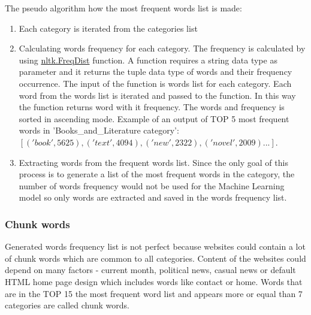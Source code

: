 The pseudo algorithm how the most frequent words list is made:
\begin{enumerate}
    \item Each category is iterated from the categories list
    \item Calculating words frequency for each category. The frequency is calculated by using \href{http://www.nltk.org/api/nltk.html?highlight=freqdist}{nltk.FreqDist} function. A function requires a string data type as parameter and it returns the tuple data type of words and their frequency occurrence. The input of the function is words list for each category. Each word from the words list is iterated and passed to the function. In this way the function returns word with it frequency. The words and frequency is sorted in ascending mode. Example of an output of TOP 5 most frequent words in 'Books\_and\_Literature category': $[('book', 5625), ('text', 4094), ('new', 2322), ('novel', 2009)...]$.
    \item Extracting words from the frequent words list. Since the only goal of this process is to generate a list of the most frequent words in the category, the number of words frequency would not be used for the Machine Learning model so only words are extracted and saved in the words frequency list.
\end{enumerate}


\subsubsection{Chunk words}

Generated words frequency list is not perfect because websites could contain a lot of chunk words which are common to all categories. Content of the websites could depend on many factors - current month, political news, casual news or default HTML home page design which includes words like contact or home. Words that are in the TOP 15 the most frequent word list and appears more or equal than 7 categories are called chunk words. 


